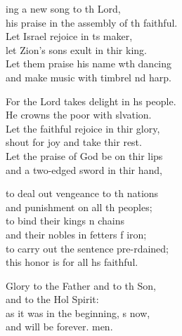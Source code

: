 \settowidth{\versewidth}{his praise in the assembly of the faithful.}
\begin{psalmverse}%
  \begin{patverse}
    ing a new song to th Lord,\Med\\
his praise in the assembly of th faithful.\\
Let Israel rejoice in \pointup{\i}ts maker,\Med\\
let Zion’s sons exult in thir king.\\
Let them praise his name w\pointup{\i}th dancing\Med\\
and make music with timbrel nd harp.

For the Lord takes delight in h\pointup{\i}s people.\Med\\
He crowns the poor with slvation.\\
Let the faithful rejoice in thir glory,\Med\\
shout for joy and take thir rest.\\
Let the praise of God be on thir lips\Med\\
and a two-edged sword in thir hand,

to deal out vengeance to th nations\Med\\
and punishment on all th peoples;\\
to bind their kings \pointup{\i}n chains\Med\\
and their nobles in fetters f iron;\\
to carry out the sentence pre-rdained;\Med\\
this honor is for all h\pointup{\i}s faithful.

Glory to the Father and to th Son,\Med\\
and to the Hol Spirit:\\
as it was in the beginning, \pointup{\i}s now,\Med\\
and will be forever. men.
  \end{patverse}
\end{psalmverse}
